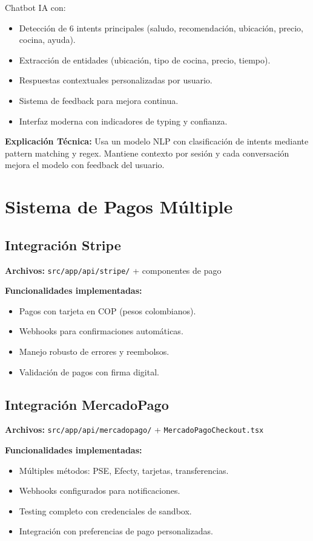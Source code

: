 \documentclass[a4paper,12pt]{article}
\begin{document}
Chatbot IA con:
\begin{itemize}
  \item Detección de 6 intents principales (saludo, recomendación, ubicación, precio, cocina, ayuda).
  \item Extracción de entidades (ubicación, tipo de cocina, precio, tiempo).
  \item Respuestas contextuales personalizadas por usuario.
  \item Sistema de feedback para mejora continua.
  \item Interfaz moderna con indicadores de typing y confianza.
\end{itemize}

\textbf{Explicación Técnica:}  
Usa un modelo NLP con clasificación de intents mediante pattern matching y regex. Mantiene contexto por sesión y cada conversación mejora el modelo con feedback del usuario.

\section{Sistema de Pagos Múltiple}

\subsection{Integración Stripe}
\textbf{Archivos:} \texttt{src/app/api/stripe/} + componentes de pago

\textbf{Funcionalidades implementadas:}
\begin{itemize}
  \item Pagos con tarjeta en COP (pesos colombianos).
  \item Webhooks para confirmaciones automáticas.
  \item Manejo robusto de errores y reembolsos.
  \item Validación de pagos con firma digital.
\end{itemize}

\subsection{Integración MercadoPago}
\textbf{Archivos:} \texttt{src/app/api/mercadopago/} + \texttt{MercadoPagoCheckout.tsx}

\textbf{Funcionalidades implementadas:}
\begin{itemize}
  \item Múltiples métodos: PSE, Efecty, tarjetas, transferencias.
  \item Webhooks configurados para notificaciones.
  \item Testing completo con credenciales de sandbox.
  \item Integración con preferencias de pago personalizadas.
\end{itemize}
\end{document}

